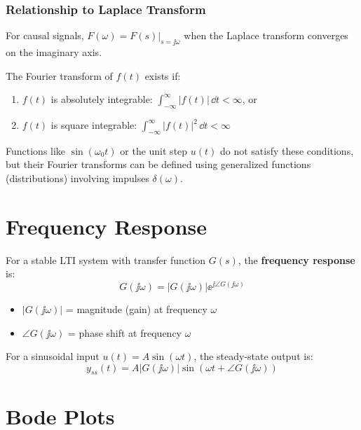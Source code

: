 \subsubsection{Relationship to Laplace Transform}
For causal signals, $F(\omega) = F(s)|_{s=\jj\omega}$ when the Laplace transform converges on the imaginary axis.

\begin{keyconceptbox}[title=When Does the Fourier Transform Exist?]
The Fourier transform of $f(t)$ exists if:
\begin{enumerate}
    \item $f(t)$ is absolutely integrable: $\displaystyle\int_{-\infty}^{\infty}|f(t)|\,\dd t < \infty$, or
    \item $f(t)$ is square integrable: $\displaystyle\int_{-\infty}^{\infty}|f(t)|^2\,\dd t < \infty$
\end{enumerate}
Functions like $\sin(\omega_0 t)$ or the unit step $u(t)$ do not satisfy these conditions, but their Fourier transforms can be defined using generalized functions (distributions) involving impulses $\delta(\omega)$.
\end{keyconceptbox}

\section{Frequency Response}

For a stable LTI system with transfer function $G(s)$, the \textbf{frequency response} is:
\begin{equation}
G(\jj\omega) = |G(\jj\omega)| \ee^{\jj\angle G(\jj\omega)}
\end{equation}

\begin{itemize}
    \item $|G(\jj\omega)|$ = magnitude (gain) at frequency $\omega$
    \item $\angle G(\jj\omega)$ = phase shift at frequency $\omega$
\end{itemize}

For a sinusoidal input $u(t) = A\sin(\omega t)$, the steady-state output is:
\begin{equation}
y_{ss}(t) = A|G(\jj\omega)|\sin(\omega t + \angle G(\jj\omega))
\end{equation}

\section{Bode Plots}

